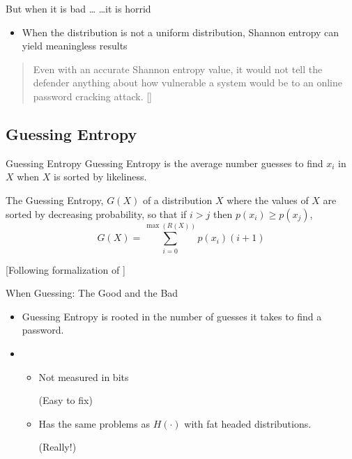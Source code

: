 \documentclass[xcolor={dvipsnames,table}]{beamer}
\newcommand\func[1]{\ensuremath{#1(\cdot)}}
\begin{document}
\begin{frame}{But when it is bad \dots}
\nocite{WeirETAL2010:CCS}
\dots it is horrid
\begin{itemize}
 \item When the distribution is not a uniform distribution, Shannon entropy can yield meaningless results
\end{itemize}
\begin{quote}
Even with an accurate Shannon entropy value, it would not tell the defender anything about how vulnerable a system would be to an online password cracking attack.
 [\cite[p.~162]{WeirETAL2010:CCS}]
\end{quote}
\end{frame}

\subsection{Guessing Entropy}

\begin{frame}{Guessing Entropy}
Guessing Entropy is the average number guesses to find $x_i$ in $X$ when $X$ is sorted by likeliness.
\begin{definition}
The Guessing Entropy, $G(X)$ of a distribution $X$ where the values of $X$ are sorted by decreasing probability, so that if $i > j$ then $p(x_i) \geq p(x_j)$,
$$
G(X) = \sum_{i=0}^{\max(R(X))} p(x_i)(i+1)
$$
\end{definition}
[Following formalization of \cite{Cederlog2005:Thesis}]
\end{frame}

\begin{frame}{When Guessing: The Good and the Bad}
\begin{itemize}
\item[Good]
Guessing Entropy is rooted in the number of guesses it takes to find a password.

\item[Bad]
\pause
\begin{itemize}
\item Not measured in bits

      \pause
      (Easy to fix)
\pause
\item Has the same problems as $\func{H}$ with fat headed distributions.

      \pause
      (Really!)
\end{itemize}
\end{itemize}
\end{frame}
\end{document}
